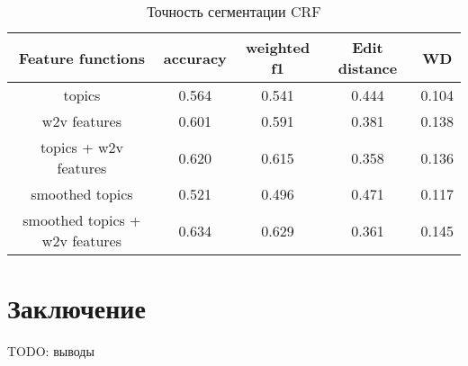 \documentclass[pdftex,ptm,12pt,a4paper]{report}
\theoremstyle{definition}
\begin{document}
\begin{table}
	\caption{\label{tab:CRF}Точность сегментации CRF}
	\begin{center}
		\begin{tabular}{|c|c|c|c|c|}
			\hline
			Feature functions & accuracy & weighted f1 & Edit distance & WD \\ 
			\hline
			topics & 0.564 & 0.541 & 0.444 & 0.104 \\ 			
			\hline
			w2v features & 0.601 & 0.591 & 0.381 & 0.138 \\
			\hline
			topics + w2v features & 0.620 & 0.615 & 0.358 & 0.136 \\  
			\hline
			smoothed topics & 0.521 & 0.496 & 0.471 & 0.117 \\
			\hline
			smoothed topics + w2v features & 0.634 & 0.629 & 0.361 & 0.145 \\
			\hline
			
		\end{tabular}
	\end{center}
\end{table}

\chapter{Заключение}

TODO: выводы

\iffalse

\section{Классификация синтаксических $n$-грамм}

Для каждой из синтаксических веток был построен вектор размерности 2400, полученный из модель skip-thought, построенной по текстам чатов технической поддержки, состоящий из более 40 миллиона слов. Тематика чатов несколько отличается от тематики текстов разговоров, тем не менее в них присутствует банковская лексика. Каждая из $n$-грамм имеет метку темы. Всего имеется 40 тем, полученных из асессорской разметки. Таким образом решается задача многоклассовой классификации на 40 классов. Лучшие результаты показала логистическая регрессия с $l_{2}$--регуляризацией: взвешенный f1-score 0.58 при 3-fold кросс-валидации.    
\fi


\end{document}
